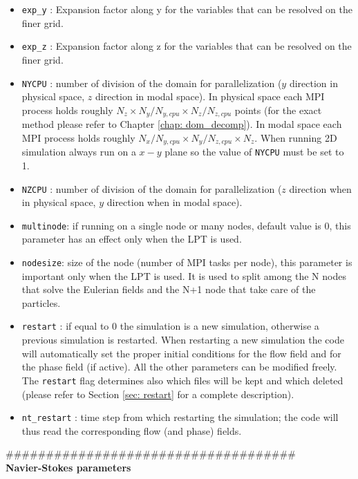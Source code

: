 \begin{itemize}
\item \texttt{exp\_y} : Expansion factor along y for the variables that can be resolved on the finer grid.
\item \texttt{exp\_z} : Expansion factor along z for the variables that can be resolved on the finer grid.
\item \texttt{NYCPU} : number of division of the domain for parallelization ($y$ direction in physical space, $z$ direction in modal space). In physical space each MPI process holds roughly $N_z\times N_y/N_{y,cpu} \times N_z/N_{z,cpu}$ points (for the exact method please refer to Chapter \ref{chap: dom_decomp}). In modal space each MPI process holds roughly $N_x/N_{y,cpu}\times N_y/N_{z,cpu}\times N_z$. When running 2D simulation always run on a $x-y$ plane so the value of \texttt{NYCPU} must be set to 1.
\item \texttt{NZCPU} : number of division of the domain for parallelization ($z$ direction when in physical space, $y$ direction when in modal space).
\item \texttt{multinode}: if running on a single node or many nodes, default value is 0, this parameter has an effect only when the LPT is used.
\item \texttt{nodesize}: size of the node (number of MPI tasks per node), this parameter is important only when the LPT is used. It is used to split among the N nodes that solve the Eulerian fields and the N+1 node that take care of the particles.
\item \texttt{restart} : if equal to 0 the simulation is a new simulation, otherwise a previous simulation is restarted. When restarting a new simulation the code will automatically set the proper initial conditions for the flow field and for the phase field (if active). All the other parameters can be modified freely. The \texttt{restart} flag determines also which files will be kept and which deleted (please refer to Section \ref{sec: restart} for a complete description).
\item \texttt{nt\_restart} : time step from which restarting the simulation; the code will thus read the corresponding flow (and phase) fields.
\end{itemize}
\#\#\#\#\#\#\#\#\#\#\#\#\#\#\#\#\#\#\#\#\#\#\#\#\#\#\#\#\#\#\#\#\#\#\#\#\\
{\bf Navier-Stokes parameters}\\

